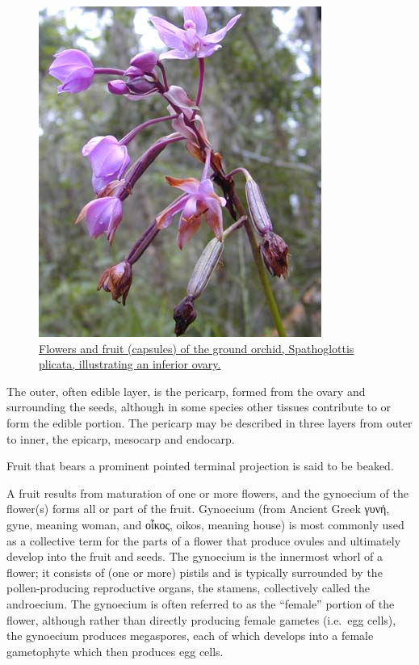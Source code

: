 \begin{figure}

{\centering \includegraphics[width=0.7\linewidth]{./figures/plants/Spathoglottis_flwrs_reduced} 

}

\caption{\href{https://commons.wikimedia.org/wiki/File:Spathoglottis_flwrs_reduced.jpg}{Flowers and fruit (capsules) of the ground orchid, Spathoglottis plicata, illustrating an inferior ovary.}}\label{fig:flowersfruits}
\end{figure}

The outer, often edible layer, is the pericarp, formed from the ovary and surrounding the seeds, although in some species other tissues contribute to or form the edible portion. The pericarp may be described in three layers from outer to inner, the epicarp, mesocarp and endocarp.

Fruit that bears a prominent pointed terminal projection is said to be beaked.

A fruit results from maturation of one or more flowers, and the gynoecium of the flower(s) forms all or part of the fruit. Gynoecium (from Ancient Greek γυνή, gyne, meaning woman, and οἶκος, oikos, meaning house) is most commonly used as a collective term for the parts of a flower that produce ovules and ultimately develop into the fruit and seeds. The gynoecium is the innermost whorl of a flower; it consists of (one or more) pistils and is typically surrounded by the pollen-producing reproductive organs, the stamens, collectively called the androecium. The gynoecium is often referred to as the ``female'' portion of the flower, although rather than directly producing female gametes (i.e.~egg cells), the gynoecium produces megaspores, each of which develops into a female gametophyte which then produces egg cells.



